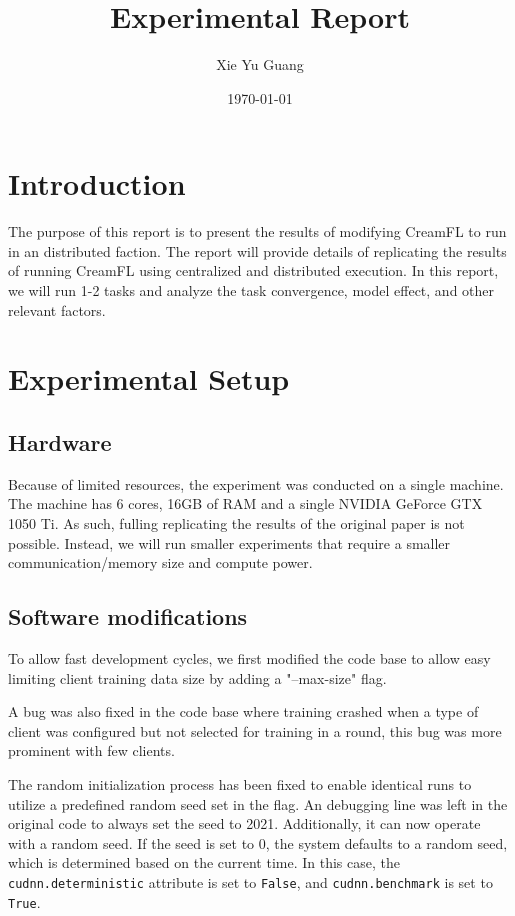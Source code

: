 \documentclass{article}
\title{Experimental Report}
\author{Xie Yu Guang}
\date{\today}
\begin{document}
\maketitle

\section{Introduction}
The purpose of this report is to present the results of modifying CreamFL to run in an distributed faction. The report will provide details of replicating the results of running CreamFL using centralized and distributed execution. In this report, we will run 1-2 tasks and analyze the task convergence, model effect, and other relevant factors.

\section{Experimental Setup}

\subsection{Hardware}
Because of limited resources, the experiment was conducted on a single machine. The machine has 6 cores, 16GB of RAM and a single NVIDIA GeForce GTX 1050 Ti. As such, fulling replicating the results of the original paper is not possible. Instead, we will run smaller experiments that require a smaller communication/memory size and compute power.

\subsection{Software modifications}
To allow fast development cycles, we first modified the code base to allow easy limiting client training data size by adding a "--max-size" flag. 

A bug was also fixed in the code base where training crashed when a type of client was configured but not selected for training in a round, this bug was more prominent with few clients. 

The random initialization process has been fixed to enable identical runs to utilize a predefined random seed set in the flag. An debugging line was left in the original code to always set the seed to 2021. Additionally, it can now operate with a random seed. If the seed is set to 0, the system defaults to a random seed, which is determined based on the current time. In this case, the \texttt{cudnn.deterministic} attribute is set to \texttt{False}, and \texttt{cudnn.benchmark} is set to \texttt{True}.
\end{document}
